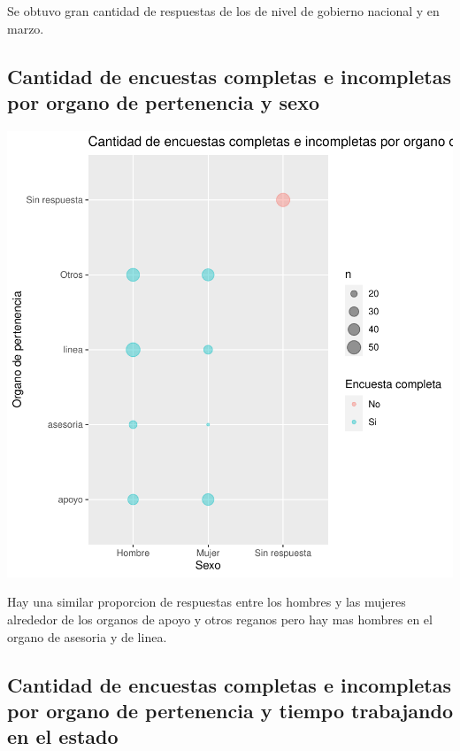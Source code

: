 \documentclass{article}
\begin{document}
Se obtuvo gran cantidad de respuestas de los de nivel de gobierno nacional y en marzo.

\subsection{Cantidad de encuestas completas e incompletas por organo de pertenencia y sexo}

\includegraphics{seguimientov3-091}

Hay una similar proporcion de respuestas entre los hombres y las mujeres alrededor de los organos de apoyo y otros reganos pero hay mas hombres en el organo de asesoria y de linea.

\subsection{Cantidad de encuestas completas e incompletas por organo de pertenencia y tiempo trabajando en el estado}
\end{document}
